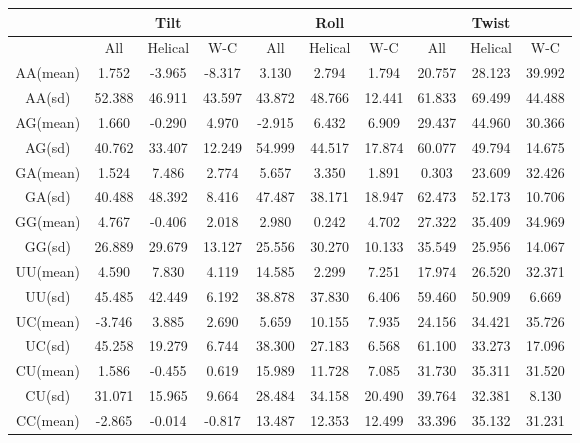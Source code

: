 \begin{table}[htbp]
\begin{center}
{\small
\begin{tabular}{|c|c|c|c|c|c|c|c|c|c|}
\hline
 & \multicolumn{3}{|c|}{Tilt} 
 & \multicolumn{3}{|c|}{Roll} 
 & \multicolumn{3}{|c|}{Twist} \\ \hline
 & All & Helical & W-C & All & Helical & W-C &
   All & Helical & W-C \\ \hline
AA(mean) &1.752 & -3.965 & -8.317 & 3.130 & 2.794 & 1.794 & 20.757 & 28.123 & 39.992 \\ \hline   
AA(sd)  & 52.388 & 46.911 & 43.597 & 43.872 & 48.766 & 12.441 & 61.833 & 69.499 & 44.488 \\ \hline
AG(mean) &1.660 & -0.290 & 4.970 & -2.915 & 6.432 & 6.909 & 29.437 & 44.960 & 30.366 \\ \hline   
AG(sd)  & 40.762 & 33.407 & 12.249 & 54.999 & 44.517 & 17.874 & 60.077 & 49.794 & 14.675 \\ \hline
GA(mean) &1.524 & 7.486 & 2.774 & 5.657 & 3.350 & 1.891 & 0.303 & 23.609 & 32.426 \\ \hline      
GA(sd)  & 40.488 & 48.392 & 8.416 & 47.487 & 38.171 & 18.947 & 62.473 & 52.173 & 10.706 \\ \hline
GG(mean) &4.767 & -0.406 & 2.018 & 2.980 & 0.242 & 4.702 & 27.322 & 35.409 & 34.969 \\ \hline    
GG(sd)  & 26.889 & 29.679 & 13.127 & 25.556 & 30.270 & 10.133 & 35.549 & 25.956 & 14.067 \\ \hline
UU(mean) &4.590 & 7.830 & 4.119 & 14.585 & 2.299 & 7.251 & 17.974 & 26.520 & 32.371 \\ \hline    
UU(sd)  & 45.485 & 42.449 & 6.192 & 38.878 & 37.830 & 6.406 & 59.460 & 50.909 & 6.669 \\ \hline  
UC(mean) &-3.746 & 3.885 & 2.690 & 5.659 & 10.155 & 7.935 & 24.156 & 34.421 & 35.726 \\ \hline   
UC(sd)  & 45.258 & 19.279 & 6.744 & 38.300 & 27.183 & 6.568 & 61.100 & 33.273 & 17.096 \\ \hline 
CU(mean) &1.586 & -0.455 & 0.619 & 15.989 & 11.728 & 7.085 & 31.730 & 35.311 & 31.520 \\ \hline  
CU(sd)  & 31.071 & 15.965 & 9.664 & 28.484 & 34.158 & 20.490 & 39.764 & 32.381 & 8.130 \\ \hline 
CC(mean) &-2.865 & -0.014 & -0.817 & 13.487 & 12.353 & 12.499 & 33.396 & 35.132 & 31.231 \\ \hline

\end{tabular}}
\end{center}
\end{table}
